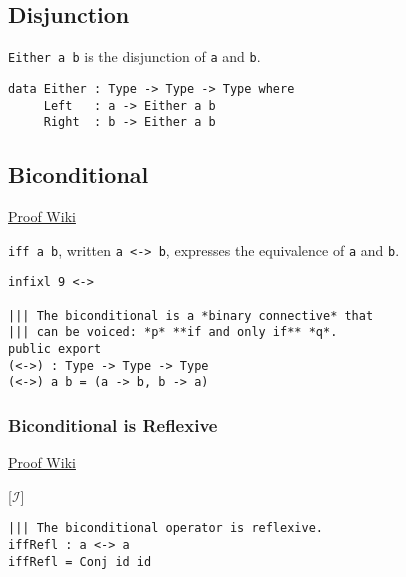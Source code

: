 \documentclass{acm_proc_article-sp}
\begin{document}
\subsection{Disjunction}\label{disjunction}

\texttt{Either a b} is the disjunction of
\texttt{a} and \texttt{b}.

\begin{verbatim}
data Either : Type -> Type -> Type where
     Left   : a -> Either a b
     Right  : b -> Either a b
\end{verbatim}

\newpage

\subsection{Biconditional}\label{biconditional}

\href{https://proofwiki.org/wiki/Definition:Biconditional}{Proof Wiki}

\begin{prooftree*}
  \Hypo{ \varphi \vdash \psi }
  \Hypo{ \psi \vdash \varphi }
\end{prooftree*}

\texttt{iff a b}, written \texttt{a <-> b},
expresses the equivalence of \texttt{a} and
\texttt{b}.

\begin{verbatim}
infixl 9 <->

||| The biconditional is a *binary connective* that
||| can be voiced: *p* **if and only if** *q*.
public export
(<->) : Type -> Type -> Type
(<->) a b = (a -> b, b -> a)
\end{verbatim}

\subsubsection{Biconditional is
Reflexive}\label{biconditional-is-reflexive}

\href{https://proofwiki.org/wiki/Biconditional_is_Reflexive}{Proof Wiki}

\begin{prooftree*}
  \Hypo { \varphi \vdash \varphi }
  [$\mathcal I$]{ \vdash \varphi \iff \varphi }
\end{prooftree*}

\begin{verbatim}
||| The biconditional operator is reflexive.
iffRefl : a <-> a
iffRefl = Conj id id
\end{verbatim}
\end{document}
